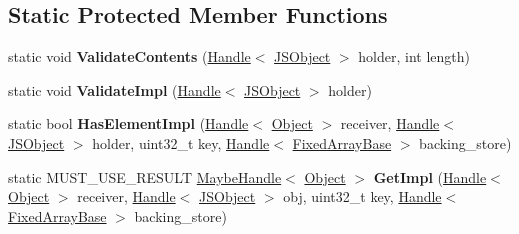 \subsection*{Static Protected Member Functions}
\begin{DoxyCompactItemize}
\item 
\hypertarget{classv8_1_1internal_1_1_elements_accessor_base_a2c07a0e8b5e9771dd8a7735a65f78ab1}{}static void {\bfseries Validate\+Contents} (\hyperlink{classv8_1_1internal_1_1_handle}{Handle}$<$ \hyperlink{classv8_1_1internal_1_1_j_s_object}{J\+S\+Object} $>$ holder, int length)\label{classv8_1_1internal_1_1_elements_accessor_base_a2c07a0e8b5e9771dd8a7735a65f78ab1}

\item 
\hypertarget{classv8_1_1internal_1_1_elements_accessor_base_a82998be27cda73f12f74ddfd4e43d4d2}{}static void {\bfseries Validate\+Impl} (\hyperlink{classv8_1_1internal_1_1_handle}{Handle}$<$ \hyperlink{classv8_1_1internal_1_1_j_s_object}{J\+S\+Object} $>$ holder)\label{classv8_1_1internal_1_1_elements_accessor_base_a82998be27cda73f12f74ddfd4e43d4d2}

\item 
\hypertarget{classv8_1_1internal_1_1_elements_accessor_base_a3266bd59a879ab43950e2d9a8aad11b3}{}static bool {\bfseries Has\+Element\+Impl} (\hyperlink{classv8_1_1internal_1_1_handle}{Handle}$<$ \hyperlink{classv8_1_1internal_1_1_object}{Object} $>$ receiver, \hyperlink{classv8_1_1internal_1_1_handle}{Handle}$<$ \hyperlink{classv8_1_1internal_1_1_j_s_object}{J\+S\+Object} $>$ holder, uint32\+\_\+t key, \hyperlink{classv8_1_1internal_1_1_handle}{Handle}$<$ \hyperlink{classv8_1_1internal_1_1_fixed_array_base}{Fixed\+Array\+Base} $>$ backing\+\_\+store)\label{classv8_1_1internal_1_1_elements_accessor_base_a3266bd59a879ab43950e2d9a8aad11b3}

\item 
\hypertarget{classv8_1_1internal_1_1_elements_accessor_base_afb8cc55ca29bb1b935404984ef2f71b2}{}static M\+U\+S\+T\+\_\+\+U\+S\+E\+\_\+\+R\+E\+S\+U\+L\+T \hyperlink{classv8_1_1internal_1_1_maybe_handle}{Maybe\+Handle}$<$ \hyperlink{classv8_1_1internal_1_1_object}{Object} $>$ {\bfseries Get\+Impl} (\hyperlink{classv8_1_1internal_1_1_handle}{Handle}$<$ \hyperlink{classv8_1_1internal_1_1_object}{Object} $>$ receiver, \hyperlink{classv8_1_1internal_1_1_handle}{Handle}$<$ \hyperlink{classv8_1_1internal_1_1_j_s_object}{J\+S\+Object} $>$ obj, uint32\+\_\+t key, \hyperlink{classv8_1_1internal_1_1_handle}{Handle}$<$ \hyperlink{classv8_1_1internal_1_1_fixed_array_base}{Fixed\+Array\+Base} $>$ backing\+\_\+store)\label{classv8_1_1internal_1_1_elements_accessor_base_afb8cc55ca29bb1b935404984ef2f71b2}


\end{DoxyCompactItemize}
